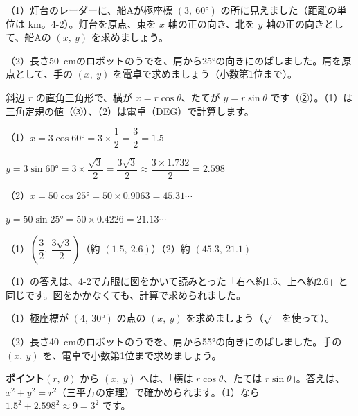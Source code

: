 \begin{reidai}
（1）灯台のレーダーに、船Aが極座標 $(3,\ \ang{60})$ の所に見えました（距離の単位は km。4-2）。灯台を原点、東を $x$ 軸の正の向き、北を $y$ 軸の正の向きとして、船Aの $(x,\ y)$ を求めましょう。\par
（2）長さ\qty{50}{cm}のロボットのうでを、肩から\ang{25}の向きにのばしました。肩を原点として、手の $(x,\ y)$ を電卓で求めましょう（小数第1位まで）。\par
\kangaekata 斜辺 $r$ の直角三角形で、横が $x=r\cos\theta$、たてが $y=r\sin\theta$ です（②）。（1）は三角定規の値（③）、（2）は電卓（DEG）で計算します。\par
\shiki（1）$x=3\cos\ang{60}=3\times\dfrac{1}{2}=\dfrac{3}{2}=1.5$\par
\hspace*{4.6\zw}$y=3\sin\ang{60}=3\times\dfrac{\sqrt3}{2}=\dfrac{3\sqrt3}{2}\approx\dfrac{3\times1.732}{2}=2.598$\par
\hspace*{2.6\zw}（2）$x=50\cos\ang{25}=50\times0.9063=45.31\cdots$\par
\hspace*{4.6\zw}$y=50\sin\ang{25}=50\times0.4226=21.13\cdots$\par
\kotae （1）$\left(\dfrac{3}{2},\ \dfrac{3\sqrt3}{2}\right)$（約 $(1.5,\ 2.6)$）\quad（2）約 $(45.3,\ 21.1)$
\end{reidai}
（1）の答えは、4-2で方眼に図をかいて読みとった「右へ約1.5、上へ約2.6」と同じです。図をかかなくても、計算で求められました。

\begin{jibun}
（1）極座標が $(4,\ \ang{30})$ の点の $(x,\ y)$ を求めましょう（$\sqrt{\phantom{3}}$ を使って）。\par
（2）長さ\qty{40}{cm}のロボットのうでを、肩から\ang{55}の向きにのばしました。手の $(x,\ y)$ を、電卓で小数第1位まで求めましょう。
\end{jibun}
\textbf{ポイント}\quad $(r,\ \theta)$ から $(x,\ y)$ へは、「横は $r\cos\theta$、たては $r\sin\theta$」。答えは、$x^2+y^2=r^2$（三平方の定理）で確かめられます。（1）なら $1.5^2+2.598^2\approx9=3^2$ です。

